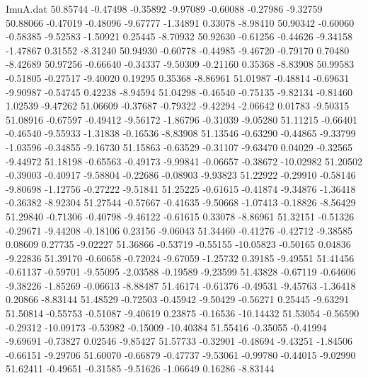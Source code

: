 \begin{filecontents}{ImuA.dat}
  50.85744   -0.47498   -0.35892   -9.97089   -0.60088   -0.27986   -9.32759
  50.88066   -0.47019   -0.48096   -9.67777   -1.34891    0.33078   -8.98410
  50.90342   -0.60060   -0.58385   -9.52583   -1.50921    0.25445   -8.70932
  50.92630   -0.61256   -0.44626   -9.34158   -1.47867    0.31552   -8.31240
  50.94930   -0.60778   -0.44985   -9.46720   -0.79170    0.70480   -8.42689
  50.97256   -0.66640   -0.34337   -9.50309   -0.21160    0.35368   -8.83908
  50.99583   -0.51805   -0.27517   -9.40020    0.19295    0.35368   -8.86961
  51.01987   -0.48814   -0.69631   -9.90987   -0.54745    0.42238   -8.94594
  51.04298   -0.46540   -0.75135   -9.82134   -0.81460    1.02539   -9.47262
  51.06609   -0.37687   -0.79322   -9.42294   -2.06642    0.01783   -9.50315
  51.08916   -0.67597   -0.49412   -9.56172   -1.86796   -0.31039   -9.05280
  51.11215   -0.66401   -0.46540   -9.55933   -1.31838   -0.16536   -8.83908
  51.13546   -0.63290   -0.44865   -9.33799   -1.03596   -0.34855   -9.16730
  51.15863   -0.63529   -0.31107   -9.63470    0.04029   -0.32565   -9.44972
  51.18198   -0.65563   -0.49173   -9.99841   -0.06657   -0.38672  -10.02982
  51.20502   -0.39003   -0.40917   -9.58804   -0.22686   -0.08903   -9.93823
  51.22922   -0.29910   -0.58146   -9.80698   -1.12756   -0.27222   -9.51841
  51.25225   -0.61615   -0.41874   -9.34876   -1.36418   -0.36382   -8.92304
  51.27544   -0.57667   -0.41635   -9.50668   -1.07413   -0.18826   -8.56429
  51.29840   -0.71306   -0.40798   -9.46122   -0.61615    0.33078   -8.86961
  51.32151   -0.51326   -0.29671   -9.44208   -0.18106    0.23156   -9.06043
  51.34460   -0.41276   -0.42712   -9.38585    0.08609    0.27735   -9.02227
  51.36866   -0.53719   -0.55155  -10.05823   -0.50165    0.04836   -9.22836
  51.39170   -0.60658   -0.72024   -9.67059   -1.25732    0.39185   -9.49551
  51.41456   -0.61137   -0.59701   -9.55095   -2.03588   -0.19589   -9.23599
  51.43828   -0.67119   -0.64606   -9.38226   -1.85269   -0.06613   -8.88487
  51.46174   -0.61376   -0.49531   -9.45763   -1.36418    0.20866   -8.83144
  51.48529   -0.72503   -0.45942   -9.50429   -0.56271    0.25445   -9.63291
  51.50814   -0.55753   -0.51087   -9.40619    0.23875   -0.16536  -10.14432
  51.53054   -0.56590   -0.29312  -10.09173   -0.53982   -0.15009  -10.40384
  51.55416   -0.35055   -0.41994   -9.69691   -0.73827    0.02546   -9.85427
  51.57733   -0.32901   -0.48694   -9.43251   -1.84506   -0.66151   -9.29706
  51.60070   -0.66879   -0.47737   -9.53061   -0.99780   -0.44015   -9.02990
  51.62411   -0.49651   -0.31585   -9.51626   -1.06649    0.16286   -8.83144

\end{filecontents}
